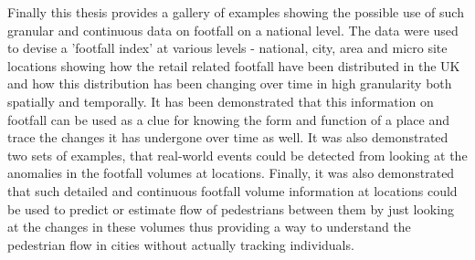 Finally this thesis provides a gallery of examples showing the possible use of such granular and continuous data on footfall on a national level.
The data were used to devise a 'footfall index' at various levels - national, city, area and micro site locations showing how the retail related footfall have been distributed in the UK and how this distribution has been changing over time in high granularity both spatially and temporally.
It has been demonstrated that this information on footfall can be used as a clue for knowing the form and function of a place and trace the changes it has undergone over time as well.
It was also demonstrated two sets of examples, that real-world events could be detected from looking at the anomalies in the footfall volumes at locations.
Finally, it was also demonstrated that such detailed and continuous footfall volume information at locations could be used to predict or estimate flow of pedestrians between them by just looking at the changes in these volumes thus providing a way to understand the pedestrian flow in cities without actually tracking individuals.



